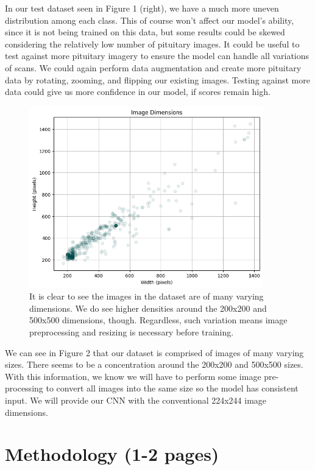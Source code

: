 \documentclass[conference]{IEEEtran}
\begin{document}
In our test dataset seen in Figure 1 (right), we have a much more uneven distribution among each class. This of course won't affect our model's ability, since it is not being trained on this data, but some results could be skewed considering the relatively low number of pituitary images. It could be useful to test against more pituitary imagery to ensure the model can handle all variations of scans. We could again perform data augmentation and create more pituitary data by rotating, zooming, and flipping our existing images. Testing against more data could give us more confidence in our model, if scores remain high.

\begin{figure}[!ht]
    \centering
    \includegraphics[width=4in]{ImageDimensions.png}
    \caption{\large It is clear to see the images in the dataset are of many varying dimensions. We do see higher densities around the 200x200 and 500x500 dimensions, though. Regardless, such variation means image preprocessing and resizing is necessary before training.}
    \label{Dimensions of images in the dataset}
\end{figure}

We can see in Figure 2 that our dataset is comprised of images of many varying sizes. There seems to be a concentration around the 200x200 and 500x500 sizes. With this information, we know we will have to perform some image pre-processing to convert all images into the same size so the model has consistent input. We will provide our CNN with the conventional 224x244 image dimensions.

\section{\large Methodology (1-2 pages)}
\end{document}
